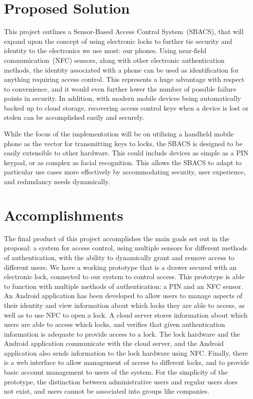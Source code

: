 \documentclass[12pt]{report}
\let\Oldsection\section
\renewcommand{\section}{\FloatBarrier\Oldsection}
\begin{document}
\section{Proposed Solution} \label{proposed-solution}

This project outlines a Sensor-Based Access Control System~(SBACS), that will expand upon the concept of using electronic
locks to further tie security and identity to the electronics we use most: our phones. Using near-field 
communication~(NFC) sensors, along with other electronic authentication methods, the identity associated with a phone
can be used as
identification for anything requiring access control. This represents a huge advantage with respect to convenience, and 
it would even further lower the number of possible failure points in security. In addition, with modern mobile devices 
being automatically backed up to cloud storage, recovering access control keys when a device is lost or stolen can be accomplished easily and securely.

While the focus of the implementation will be on utilising a handheld mobile phone as the vector for transmitting keys
to locks, the SBACS is designed to be easily extensible to other hardware. This could include devices as simple as a PIN
keypad, or as complex as facial recognition. This allows the SBACS to adapt to particular use cases more effectively
by accommodating security, user experience, and redundancy needs dynamically.

\section{Accomplishments} \label{accomplishments}

The final product of this project accomplishes the main goals set out in the proposal: a system for access control,
using multiple sensors for different methods of authentication, with the ability to dynamically grant and remove
access to different users. We have a working prototype that is a drawer secured with an electronic lock, connected
to our system to control access. This prototype is able to function with multiple methods of authentication: a PIN
and an NFC sensor. An Android application has been developed to allow users to manage aspects of their identity and
view information about which locks they are able to access, as well as to use NFC to open a lock. A cloud server stores
information about which users are able to access which locks, and verifies that given authentication information is
adequate to provide access to a lock. The lock hardware and the Android application communicate with the cloud server,
and the Android application also sends information to the lock hardware using NFC. Finally, there is a web interface
to allow management of access to different locks, and to provide basic account management to users of the system.
For the simplicity of the prototype, the distinction between administrative users and regular users does not exist, and
users cannot be associated into groups like companies.
\end{document}

